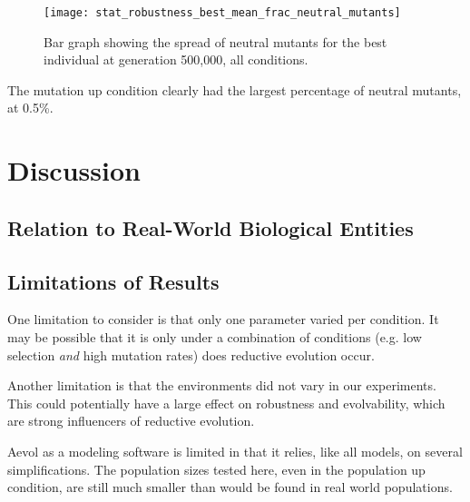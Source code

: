 \begin{figure}[H]
	\centering
	\texttt{[image: stat\_robustness\_best\_mean\_frac\_neutral\_mutants]}
	\caption[Robustness bar graph]{Bar graph showing the spread of neutral mutants for the best individual at generation 500,000, all conditions.}
	\label{fig:mean_robustness_all_conditions}
\end{figure}
The mutation up condition clearly had the largest percentage of neutral mutants, at 0.5\%. 
\section{Discussion}\label{discussion}

\subsection{Relation to Real-World Biological Entities}
\subsection{Limitations of Results}\label{limitations}
One limitation to consider is that only one parameter varied per condition. It may be possible that it is only under a combination of conditions (e.g. low selection \textit{and} high mutation rates) does reductive evolution occur. 

Another limitation is that the environments did not vary in our experiments. This could potentially have a large effect on robustness and evolvability, which are strong influencers of reductive evolution. 

Aevol as a modeling software is limited in that it relies, like all models, on several simplifications. The population sizes tested here, even in the population up condition, are still much smaller than would be found in real world populations. 